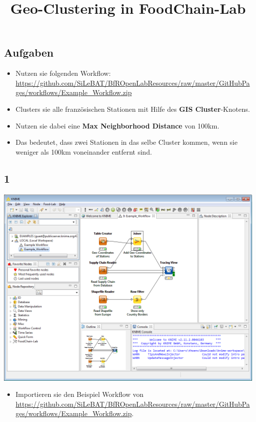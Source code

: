 \documentclass{beamer}
\title{Geo-Clustering in FoodChain-Lab}
\date{}
\begin{document}
\maketitle

\section{ }

\subsection{Aufgaben}
\begin{frame}
	\begin{itemize}
		\item Nutzen sie folgenden Workflow: \url{https://github.com/SiLeBAT/BfROpenLabResources/raw/master/GitHubPages/workflows/Example_Workflow.zip}
		\item Clusters sie alle französischen Stationen mit Hilfe des \textbf{GIS Cluster}-Knotens.
		\item Nutzen sie dabei eine \textbf{Max Neighborhood Distance} von 100km.
		\item Das bedeutet, dass zwei Stationen in das selbe Cluster kommen, wenn sie weniger als 100km voneinander entfernt sind.
	\end{itemize}
\end{frame}
 
\subsection{1}
\begin{frame}
	\begin{center}
  		\includegraphics[height=0.6\textheight]{1.png}
	\end{center}
	\begin{itemize}
		\item Importieren sie den Beispiel Workflow von \url{https://github.com/SiLeBAT/BfROpenLabResources/raw/master/GitHubPages/workflows/Example_Workflow.zip}.
	\end{itemize}
\end{frame}
\end{document}
